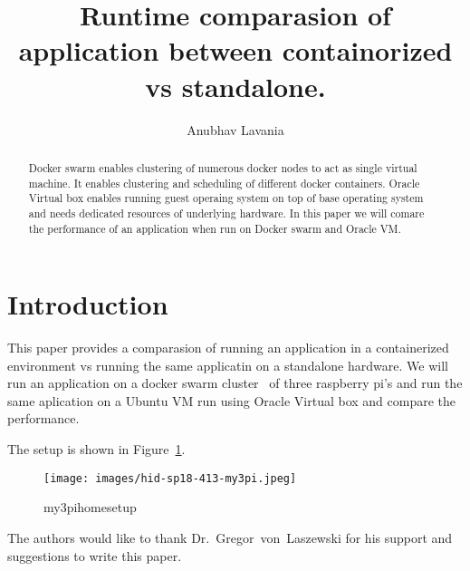 
\title{Runtime comparasion of application between containorized vs standalone.}

\author{Anubhav Lavania}


\renewcommand{\shortauthors}{G. v. Laszewski}


\begin{abstract}
Docker swarm enables clustering of numerous docker nodes to act as
single virtual machine. It enables clustering and scheduling of
different docker containers. 
Oracle Virtual box enables running guest operaing system on top of
base operating system and needs dedicated resources of underlying
hardware.
In this paper we will comare the performance of an application when
run on Docker swarm and Oracle VM.

\end{abstract}



\maketitle


\section{Introduction}

This paper provides a comparasion of running an application in a
containerized environment vs running the same applicatin on a
standalone hardware. We will run an application on a docker swarm
cluster~\cite{hid-sp18-413-dockerswarm} of three raspberry pi's and
run the same aplication on a Ubuntu VM run using Oracle Virtual box and compare the performance.

The setup is shown in Figure~\ref{F:setup}.

\begin{figure}[!ht]
  \centering\texttt{[image: images/hid-sp18-413-my3pi.jpeg]}
  \caption{my3pihomesetup}\label{F:setup}
\end{figure}


\begin{acks}

  The authors would like to thank Dr.~Gregor~von~Laszewski for his
  support and suggestions to write this paper.

\end{acks}


 

